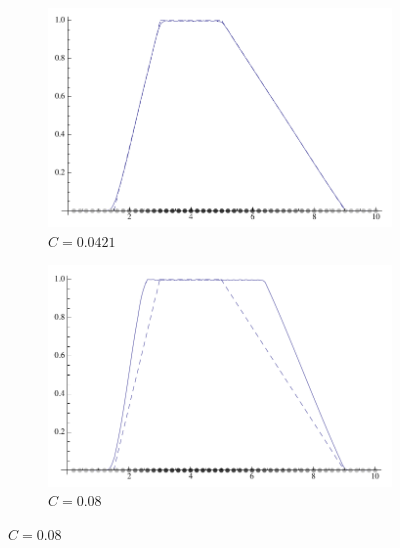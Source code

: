 \documentclass[a4paper,12pt]{report}
\begin{document}
\begin{figure}[h]
    \begin{subfigure}[t]{0.32\textwidth}
       \centering
       \includegraphics[scale=0.18]{images/parametro_C_1.png}
       \caption{$C = 0.0421 $}
       \label{fig:C_1}

    \end{subfigure}
    \begin{subfigure}[t]{0.32\textwidth}
        \centering
        \includegraphics[scale=0.18]{images/parametro_C_2.png} 
        \caption{$C = 0.08 $}
        \label{fig:C_2}


\end{subfigure}
\end{figure}
\end{document}
